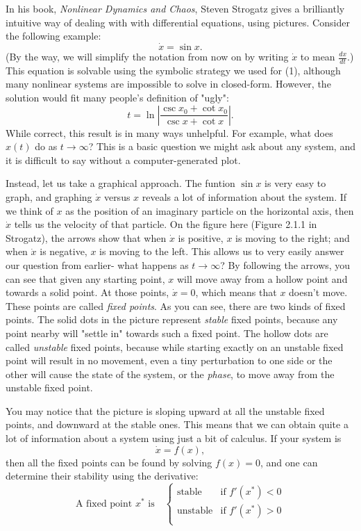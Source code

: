 \documentclass[a5paper]{article}
\theoremstyle{definition}%
\numberwithin{exercise}{section}
\theoremstyle{remark}%
\begin{document}
In his book, \textit{Nonlinear Dynamics and Chaos}, Steven Strogatz gives a brilliantly intuitive way of dealing with with differential equations, using pictures. Consider the following example:
\begin{equation}
\dot{x}=\sin x.
\end{equation}
(By the way, we will simplify the notation from now on by writing $\dot{x}$ to mean $\frac{dx}{dt}$.) This equation is solvable using the symbolic strategy we used for (1), although many nonlinear systems are impossible to solve in closed-form. However, the solution would fit many people's definition of "ugly":
\begin{equation}
t=\ln\left|\frac{\csc x_0 + \cot x_0}{\csc x + \cot x}\right|.
\end{equation}
While correct, this result is in many ways unhelpful. For example, what does $x(t)$ do as $t\to\infty$? This is a basic question we might ask about any system, and it is difficult to say without a computer-generated plot.

Instead, let us take a graphical approach. The funtion $\sin x$ is very easy to graph, and graphing $\dot{x}$ versus $x$ reveals a lot of information about the system. If we think of $x$ as the position of an imaginary particle on the horizontal axis, then $\dot{x}$ tells us the velocity of that particle. 
On the figure here (Figure 2.1.1 in Strogatz), the arrows show that when $\dot{x}$ is positive, $x$ is moving to the right; and when $\dot{x}$ is negative, $x$ is moving to the left. This allows us to very easily answer our question from earlier- what happens as $t\to\infty$? By following the arrows, you can see that given any starting point, $x$ will move away from a hollow point and towards a solid point. At those points, $\dot{x}=0$, which means that $x$ doesn't move. These points are called \emph{fixed points}. As you can see, there are two kinds of fixed points. The solid dots in the picture represent \emph{stable} fixed points, because any point nearby will "settle in" towards such a fixed point. The hollow dots are called \emph{unstable} fixed points, because while starting exactly on an unstable fixed point will result in no movement, even a tiny perturbation to one side or the other will cause the state of the system, or the \emph{phase}, to move away from the unstable fixed point. 

You may notice that the picture is sloping upward at all the unstable fixed points, and downward at the stable ones. This means that we can obtain quite a lot of information about a system using just a bit of calculus. If your system is 
$$\dot{x}=f(x),$$
then all the fixed points can be found by solving $f(x)=0$, and one can determine their stability using the derivative:
\[\text{A fixed point } x^* \text{ is} \quad
\begin{cases}
\text{stable} & \text{if } f'(x^*)<0\\
\text{unstable} & \text{if } f'(x^*)>0\\
\end{cases}
\]
\end{document}
